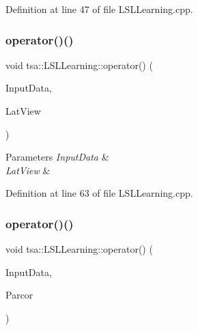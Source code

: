 Definition at line 47 of file L\+S\+L\+Learning.\+cpp.

\mbox{\label{classtsa_1_1_l_s_l_learning_a8a3c4b73d36808f940cd37fe8520d76f}} 
\subsubsection{\texorpdfstring{operator()()}{operator()()}\hspace{0.1cm}{\footnotesize\ttfamily [2/3]}}
{\footnotesize\ttfamily void tsa\+::\+L\+S\+L\+Learning\+::operator() (\begin{DoxyParamCaption}\item[{\hyperlink{namespacetsa_ac599574bcc094eda25613724b8f3ca9e}{Seq\+View\+Double} \&}]{Input\+Data,  }\item[{\hyperlink{classtsa_1_1_lattice_view}{Lattice\+View} \&}]{Lat\+View }\end{DoxyParamCaption})}


\begin{DoxyParams}{Parameters}
{\em Input\+Data} & \\
\hline
{\em Lat\+View} & \\
\hline
\end{DoxyParams}


Definition at line 63 of file L\+S\+L\+Learning.\+cpp.

\mbox{\label{classtsa_1_1_l_s_l_learning_adaf7049997744cc383427c0c673549f7}} 
\subsubsection{\texorpdfstring{operator()()}{operator()()}\hspace{0.1cm}{\footnotesize\ttfamily [3/3]}}
{\footnotesize\ttfamily void tsa\+::\+L\+S\+L\+Learning\+::operator() (\begin{DoxyParamCaption}\item[{\hyperlink{namespacetsa_ac599574bcc094eda25613724b8f3ca9e}{Seq\+View\+Double} \&}]{Input\+Data,  }\item[{\hyperlink{namespacetsa_a8900fb03d849baf447a1a0efe2561fb2}{Dvector} \&}]{Parcor }\end{DoxyParamCaption})}


